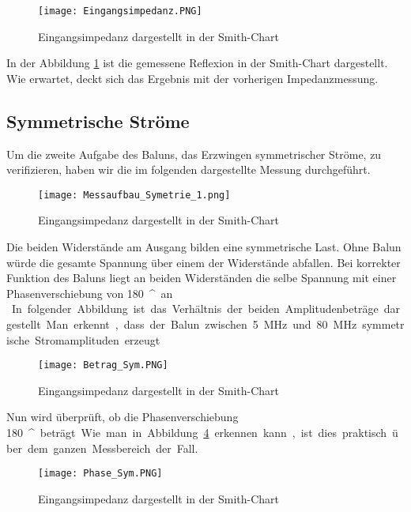 \begin{figure}[H]
	\centering
	\texttt{[image: Eingangsimpedanz.PNG]}
	\caption{Eingangsimpedanz dargestellt in der Smith-Chart}\label{fig:Eingangsimpedanz}
\end{figure}

In der Abbildung \ref{fig:Eingangsimpedanz} ist die gemessene Reflexion in der Smith-Chart dargestellt. Wie erwartet, deckt sich das Ergebnis mit der vorherigen Impedanzmessung.
\newpage
\subsection{Symmetrische Ströme}

Um die zweite Aufgabe des Baluns, das Erzwingen symmetrischer Ströme, zu verifizieren, haben wir die im folgenden dargestellte Messung durchgeführt.
\begin{figure}[H]
	\centering
	\texttt{[image: Messaufbau\_Symetrie\_1.png]}
	\caption{Eingangsimpedanz dargestellt in der Smith-Chart}\label{fig:mess_sym}
\end{figure}
Die beiden Widerstände am Ausgang bilden eine symmetrische Last. Ohne Balun würde die gesamte Spannung über einem der Widerstände abfallen. Bei korrekter Funktion des Baluns liegt an beiden Widerständen die selbe Spannung mit einer Phasenverschiebung von \SI{180}{^\circ} an.\\
In folgender Abbildung ist das Verhältnis der beiden Amplitudenbeträge dargestellt. Man erkennt, dass der Balun zwischen \SI{5}{MHz} und \SI{80}{MHz} symmetrische Stromamplituden erzeugt. \cite{balun_work}
\cite{balun_meas}
\begin{figure}[H]
	\centering
	\texttt{[image: Betrag\_Sym.PNG]}
	\caption{Eingangsimpedanz dargestellt in der Smith-Chart}\label{fig:Betrag_sym}
\end{figure}
Nun wird überprüft, ob die Phasenverschiebung \SI{180}{^\circ} beträgt. Wie man in Abbildung \ref{fig:Phase_sym} erkennen kann, ist dies praktisch über dem ganzen Messbereich der Fall.
\begin{figure}[H]
	\centering
	\texttt{[image: Phase\_Sym.PNG]}
	\caption{Eingangsimpedanz dargestellt in der Smith-Chart}\label{fig:Phase_sym}
\end{figure}